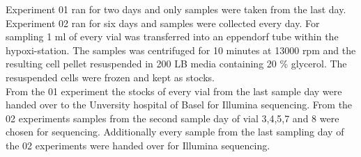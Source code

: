 Experiment 01 ran for two days and only samples were taken from the last day. Experiment 02 ran for six days and samples were collected every day. For sampling 1 ml of every vial was transferred into an eppendorf tube within the hypoxi-station. The samples was centrifuged for 10 minutes at 13000 rpm and the resulting cell pellet resuspended in 200 \textmu LB media containing 20 \% glycerol. The resuspended cells were frozen and kept as stocks. \\
From the 01 experiment the stocks of every vial from the last sample day were handed over to the Unversity hospital of Basel for Illumina sequencing. From the 02 experiments samples from the second sample day of vial 3,4,5,7 and 8 were chosen for sequencing. Additionally every sample from the last sampling day of the 02 experiments were handed over for Illumina sequencing. 